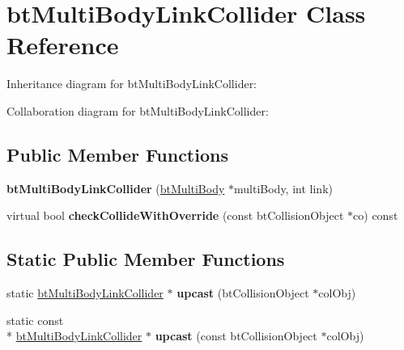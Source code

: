 \hypertarget{classbt_multi_body_link_collider}{\section{bt\+Multi\+Body\+Link\+Collider Class Reference}
\label{classbt_multi_body_link_collider}
}


Inheritance diagram for bt\+Multi\+Body\+Link\+Collider\+:


Collaboration diagram for bt\+Multi\+Body\+Link\+Collider\+:
\subsection*{Public Member Functions}
\begin{DoxyCompactItemize}
\item 
\hypertarget{classbt_multi_body_link_collider_a0d29921517b629bac94bd559b5fc3061}{{\bfseries bt\+Multi\+Body\+Link\+Collider} (\hyperlink{classbt_multi_body}{bt\+Multi\+Body} $\ast$multi\+Body, int link)}\label{classbt_multi_body_link_collider_a0d29921517b629bac94bd559b5fc3061}

\item 
\hypertarget{classbt_multi_body_link_collider_a77a38105087967c02537208cbaf6d99c}{virtual bool {\bfseries check\+Collide\+With\+Override} (const bt\+Collision\+Object $\ast$co) const }\label{classbt_multi_body_link_collider_a77a38105087967c02537208cbaf6d99c}

\end{DoxyCompactItemize}
\subsection*{Static Public Member Functions}
\begin{DoxyCompactItemize}
\item 
\hypertarget{classbt_multi_body_link_collider_aa667b2f40a74aa2cb7c04202af71fa36}{static \hyperlink{classbt_multi_body_link_collider}{bt\+Multi\+Body\+Link\+Collider} $\ast$ {\bfseries upcast} (bt\+Collision\+Object $\ast$col\+Obj)}\label{classbt_multi_body_link_collider_aa667b2f40a74aa2cb7c04202af71fa36}

\item 
\hypertarget{classbt_multi_body_link_collider_a7bbb9cd2e18f2b262e65c6651b58dc01}{static const \\*
\hyperlink{classbt_multi_body_link_collider}{bt\+Multi\+Body\+Link\+Collider} $\ast$ {\bfseries upcast} (const bt\+Collision\+Object $\ast$col\+Obj)}\label{classbt_multi_body_link_collider_a7bbb9cd2e18f2b262e65c6651b58dc01}

\end{DoxyCompactItemize}
